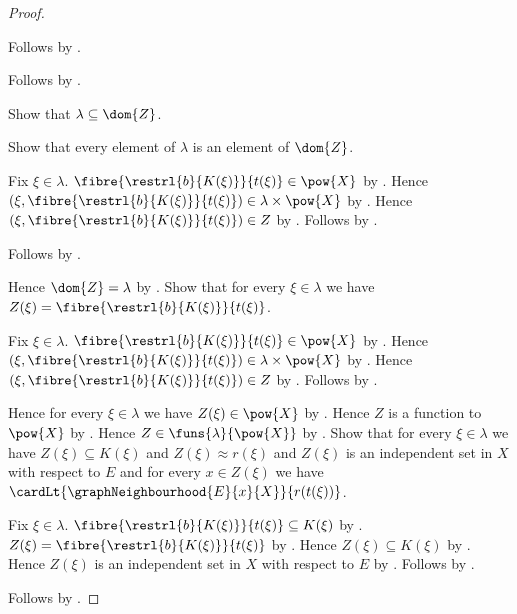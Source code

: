 \begin{proof}
\begin{subproof}
\begin{subproof}
            Follows by \auto.
        \end{subproof}
        Follows by .
    \end{subproof}
    Show that $\lambda\subseteq\dom{Z}$.
    \begin{subproof}
        Show that every element of $\lambda$ is an element of $\dom{Z}$.
        \begin{subproof}
            Fix $\xi\in\lambda$.
            $\fibre{\restrl{b}{K(\xi)}}{t(\xi)}\in\pow{X}$ by
                \auto.
            Hence $(\xi,\fibre{\restrl{b}{K(\xi)}}{t(\xi)})
                \in\lambda\times\pow{X}$ by .
            Hence $(\xi,\fibre{\restrl{b}{K(\xi)}}{t(\xi)})\in Z$ by
                .
            Follows by .
        \end{subproof}
        Follows by .
    \end{subproof}
    Hence $\dom{Z}=\lambda$ by .
    Show that for every $\xi\in\lambda$ we have
        $Z(\xi)=\fibre{\restrl{b}{K(\xi)}}{t(\xi)}$.
    \begin{subproof}
        Fix $\xi\in\lambda$.
        $\fibre{\restrl{b}{K(\xi)}}{t(\xi)}\in\pow{X}$ by
            \auto.
        Hence $(\xi,\fibre{\restrl{b}{K(\xi)}}{t(\xi)})
            \in\lambda\times\pow{X}$ by .
        Hence $(\xi,\fibre{\restrl{b}{K(\xi)}}{t(\xi)})\in Z$ by
            .
        Follows by .
    \end{subproof}
    Hence for every $\xi\in\lambda$ we have $Z(\xi)\in\pow{X}$ by
        \auto.
    Hence $Z$ is a function to $\pow{X}$ by \auto.
    Hence $Z\in\funs{\lambda}{\pow{X}}$ by .
    Show that for every $\xi\in\lambda$ we have
        $Z(\xi)\subseteq K(\xi)$ and $Z(\xi)\approx r(\xi)$ and
        $Z(\xi)$ is an independent set in $X$ with respect to $E$ and
        for every $x\in Z(\xi)$ we have
            $\cardLt{\graphNeighbourhood{E}{x}{X}}{r(t(\xi))}$.
    \begin{subproof}
        Fix $\xi\in\lambda$.
        $\fibre{\restrl{b}{K(\xi)}}{t(\xi)}\subseteq K(\xi)$ by
            \auto.
        $Z(\xi)=\fibre{\restrl{b}{K(\xi)}}{t(\xi)}$ by \auto.
        Hence $Z(\xi)\subseteq K(\xi)$ by \auto.
        Hence $Z(\xi)$ is an independent set in $X$ with respect to $E$ by
            .
        Follows by \auto.
    \end{subproof}
    Follows by \auto.
\end{proof}

